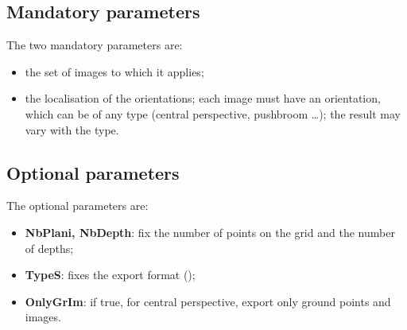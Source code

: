 \documentclass[a4paper]{article}
\begin{document}

\subsection{Mandatory parameters}

The two mandatory parameters are:

\begin{itemize}
  \item the set of images to which it applies;
  \item the localisation of the orientations; each image must have an
        orientation, which can be of any type (central perspective,
        pushbroom \dots); the result may vary with the type.
\end{itemize}


\subsection{Optional parameters}

The optional parameters are:

\begin{itemize}
  \item \textbf{NbPlani, NbDepth}: fix the number of points on the grid and
        the number of depths;
  \item \textbf{TypeS}: fixes the export format ();
  \item \textbf{OnlyGrIm}: if true, for central perspective, export only
        ground points and images.
\end{itemize}
\end{document}
